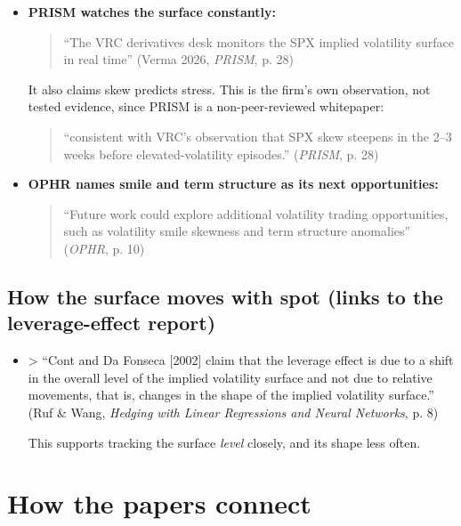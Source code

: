 \documentclass{article}
\begin{document}
\begin{itemize}

\item \textbf{PRISM watches the surface constantly:}

\begin{quote}``The VRC derivatives desk monitors the SPX implied volatility surface in real time'' (Verma 2026, \emph{PRISM}, p. 28)\end{quote}

It also claims skew predicts stress. This is the firm's own observation, not tested evidence, since PRISM is a non-peer-reviewed whitepaper:

\begin{quote}``consistent with VRC's observation that SPX skew steepens in the 2--3 weeks before elevated-volatility episodes.'' (\emph{PRISM}, p. 28)\end{quote}

\item \textbf{OPHR names smile and term structure as its next opportunities:}

\begin{quote}``Future work could explore additional volatility trading opportunities, such as volatility smile skewness and term structure anomalies'' (\emph{OPHR}, p. 10)\end{quote}

\end{itemize}

\subsection{How the surface moves with spot (links to the leverage-effect report)}

\begin{itemize}

\item

> ``Cont and Da Fonseca [2002] claim that the leverage effect is due to a shift in the overall level of the implied volatility surface and not due to relative movements, that is, changes in the shape of the implied volatility surface.'' (Ruf \& Wang, \emph{Hedging with Linear Regressions and Neural Networks}, p. 8)

This supports tracking the surface \emph{level} closely, and its shape less often.

\end{itemize}

\section{How the papers connect}
\end{document}
